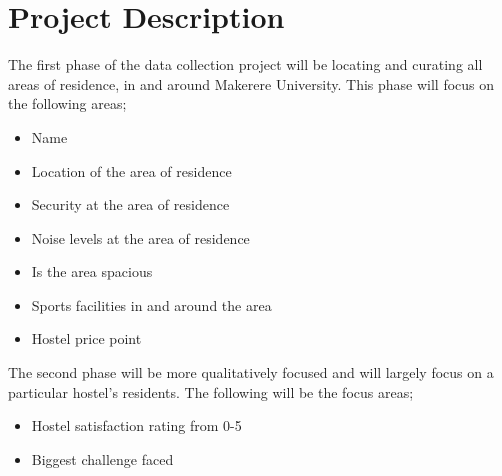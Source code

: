 \chapter{Project Description}

The first phase of the data collection project will be locating and curating all areas of residence, in and around Makerere University.
This phase will focus on the following areas;
\begin{itemize}
    \item Name
    \item Location of the area of residence
    \item Security at the area of residence
    \item Noise levels at the area of residence
    \item Is the area spacious
    \item Sports facilities in and around the area
    \item Hostel price point
\end{itemize}

The second phase will be more qualitatively focused and will largely focus on a particular hostel's residents.
The following will be the focus areas;
\begin{itemize}
    \item Hostel satisfaction rating from 0-5
    \item Biggest challenge faced
\end{itemize}
